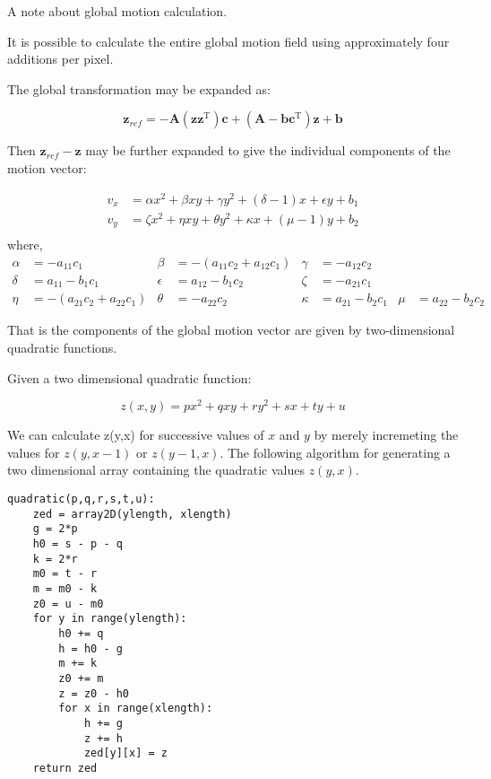 \begin{informative}
A note about global motion calculation.

It is possible to calculate the entire global motion field using
approximately four additions per pixel.

The global transformation may be expanded as:

\begin{equation*}
\pmb{z}_{ref} = -\pmb{A}\left(\pmb{z}\pmb{z}^\text{T}\right)\pmb{c}
                + \left(\pmb{A} - \pmb{b}\pmb{c}^\text{T}\right)\pmb{z}
                + \pmb{b}
\end{equation*}

Then $\pmb{z}_{ref} - \pmb{z}$ may be further expanded to give the individual
components of the motion vector:

\begin{align*}
  v_x &= \alpha{}x^2 + \beta{}xy + \gamma{}y^2 + (\delta - 1)x + \epsilon{}y + b_1 \\
  v_y &= \zeta{}x^2 + \eta{}xy + \theta{}y^2 + \kappa{}x + (\mu - 1)y + b_2 \\
\end{align*}
where,
\begin{align*}
\alpha &= -a_{11}c_1 &
\beta &= -(a_{11}c_2 + a_{12}c_1) &
\gamma &= -a_{12}c_2 \\
\delta &= a_{11} - b_1c_1 &
\epsilon &= a_{12} - b_1c_2 &
\zeta &= -a_{21}c_1 \\
\eta &= -(a_{21}c_2 + a_{22}c_1) &
\theta &= -a_{22}c_2 &
\kappa &= a_{21} - b_2c_1 &
\mu &= a_{22} - b_2c_2
\end{align*}

That is the components of the global motion vector are given by
two-dimensional quadratic functions.

Given a two dimensional quadratic function:

\begin{equation*}
z(x,y) = px^2 + qxy + ry^2 + sx + ty + u
\end{equation*}

We can calculate z(y,x) for successive values of $x$ and $y$ by merely
incremeting the values for $z(y, x-1)$ or $z(y-1, x)$.  The following
algorithm for generating a two dimensional array containing the quadratic
values $z(y,x)$.

\begin{verbatim}
quadratic(p,q,r,s,t,u):
    zed = array2D(ylength, xlength)
    g = 2*p
    h0 = s - p - q
    k = 2*r
    m0 = t - r
    m = m0 - k
    z0 = u - m0
    for y in range(ylength):
        h0 += q
        h = h0 - g
        m += k
        z0 += m
        z = z0 - h0
        for x in range(xlength):
            h += g
            z += h
            zed[y][x] = z
    return zed
\end{verbatim}

\end{informative}
